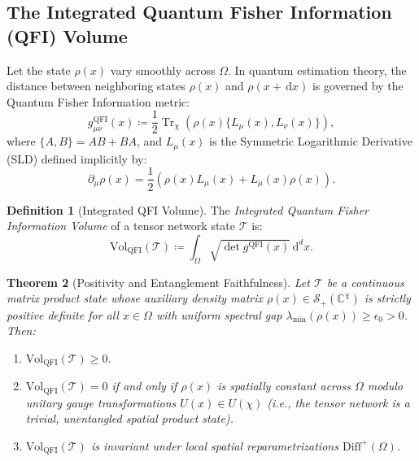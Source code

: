 \documentclass[11pt,a4paper,reqno]{amsart}
\newtheorem{theorem}{Theorem}[section]
\theoremstyle{definition}
\newtheorem{definition}[theorem]{Definition}
\numberwithin{equation}{section}
\newcommand{\Tr}{\operatorname{Tr}}
\newcommand{\dif}{\,\mathrm{d}}
\begin{document}
\subsection{The Integrated Quantum Fisher Information (QFI) Volume}
Let the state $\rho(x)$ vary smoothly across $\Omega$. In quantum estimation theory, the distance between neighboring states $\rho(x)$ and $\rho(x + \dif x)$ is governed by the Quantum Fisher Information metric:
\begin{equation}
    g^{\mathrm{QFI}}_{\mu\nu}(x) \coloneqq \frac{1}{2} \Tr_\chi \left( \rho(x) \{ L_\mu(x), L_\nu(x) \} \right),
\end{equation}
where $\{A, B\} = AB + BA$, and $L_\mu(x)$ is the Symmetric Logarithmic Derivative (SLD) defined implicitly by:
\begin{equation}
    \partial_\mu \rho(x) = \frac{1}{2} \left( \rho(x) L_\mu(x) + L_\mu(x) \rho(x) \right).
    \label{eq:sld_implicit}
\end{equation}

\begin{definition}[Integrated QFI Volume]
The \emph{Integrated Quantum Fisher Information Volume} of a tensor network state $\mathcal{T}$ is:
\begin{equation}
    \mathrm{Vol}_{\mathrm{QFI}}(\mathcal{T}) \coloneqq \int_\Omega \sqrt{\det g^{\mathrm{QFI}}(x)} \dif^d x.
\end{equation}
\end{definition}

\begin{theorem}[Positivity and Entanglement Faithfulness]
\label{thm:qfi_volume}
Let $\mathcal{T}$ be a continuous matrix product state whose auxiliary density matrix $\rho(x) \in \mathcal{S}_+(\mathbb{C}^\chi)$ is strictly positive definite for all $x \in \Omega$ with uniform spectral gap $\lambda_{\min}(\rho(x)) \ge \epsilon_0 > 0$. Then:
\begin{enumerate}[label=(\alph*)]
    \item $\mathrm{Vol}_{\mathrm{QFI}}(\mathcal{T}) \ge 0$.
    \item $\mathrm{Vol}_{\mathrm{QFI}}(\mathcal{T}) = 0$ if and only if $\rho(x)$ is spatially constant across $\Omega$ modulo unitary gauge transformations $U(x) \in U(\chi)$ (i.e., the tensor network is a trivial, unentangled spatial product state).
    \item $\mathrm{Vol}_{\mathrm{QFI}}(\mathcal{T})$ is invariant under local spatial reparametrizations $\mathrm{Diff}^+(\Omega)$.
\end{enumerate}
\end{theorem}
\end{document}
